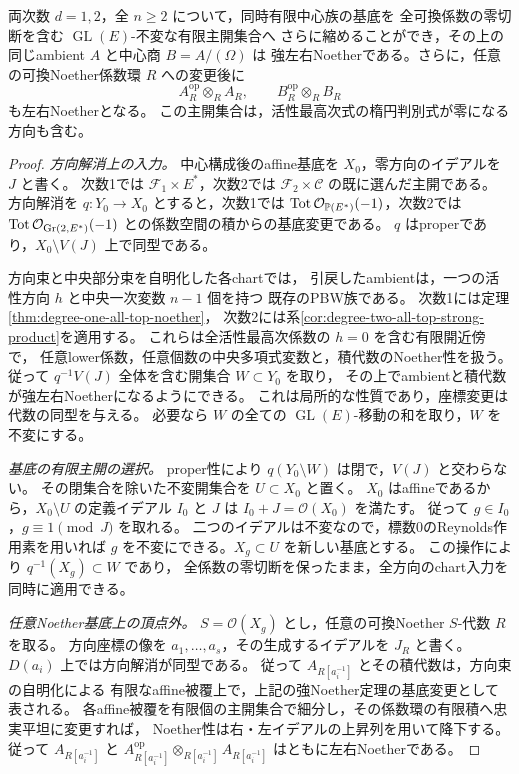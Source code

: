 \begin{theorem}\label{thm:simultaneous-strong-product-noether}
両次数 $d=1,2$，全 $n\ge2$ について，同時有限中心族の基底を
全可換係数の零切断を含む $\operatorname{GL}(E)$-不変な有限主開集合へ
さらに縮めることができ，その上の同じambient $A$ と中心商 $B=A/(\Omega)$ は
強左右Noetherである。さらに，任意の可換Noether係数環 $R$ への変更後に
\[
 A_R^{\mathrm{op}}\otimes_R A_R,\qquad
 B_R^{\mathrm{op}}\otimes_R B_R
\]
も左右Noetherとなる。
この主開集合は，活性最高次式の楕円判別式が零になる方向も含む。
\end{theorem}
\begin{proof}
\emph{方向解消上の入力。}
中心構成後のaffine基底を $X_0$，零方向のイデアルを $J$ と書く。
次数1では $\mathcal F_1\times E^*$，次数2では
$\mathcal F_2\times\mathcal C$ の既に選んだ主開である。
方向解消を $q:Y_0\to X_0$ とすると，次数1では
$\operatorname{Tot}\mathcal O_{\mathbb P(E^*)}(-1)$，次数2では
$\operatorname{Tot}\mathcal O_{\operatorname{Gr}(2,E^*)}(-1)$ との係数空間の積からの基底変更である。
$q$ はproperであり，$X_0\setminus V(J)$ 上で同型である。

方向束と中央部分束を自明化した各chartでは，
引戻したambientは，一つの活性方向 $h$ と中央一次変数 $n-1$ 個を持つ
既存のPBW族である。
次数1には定理\ref{thm:degree-one-all-top-noether}，
次数2には系\ref{cor:degree-two-all-top-strong-product}を適用する。
これらは全活性最高次係数の $h=0$ を含む有限開近傍で，
任意lower係数，任意個数の中央多項式変数と，積代数のNoether性を扱う。
従って $q^{-1}V(J)$ 全体を含む開集合 $W\subset Y_0$ を取り，
その上でambientと積代数が強左右Noetherになるようにできる。
これは局所的な性質であり，座標変更は代数の同型を与える。
必要なら $W$ の全ての $\operatorname{GL}(E)$-移動の和を取り，$W$ を不変にする。

\emph{基底の有限主開の選択。}
proper性により $q(Y_0\setminus W)$ は閉で，$V(J)$ と交わらない。
その閉集合を除いた不変開集合を $U\subset X_0$ と置く。
$X_0$ はaffineであるから，$X_0\setminus U$ の定義イデアル $I_0$ と
$J$ は $I_0+J=\mathcal O(X_0)$ を満たす。
従って $g\in I_0$，$g\equiv1\pmod J$ を取れる。
二つのイデアルは不変なので，標数0のReynolds作用素を用いれば
$g$ を不変にできる。$X_g\subset U$ を新しい基底とする。
この操作により $q^{-1}(X_g)\subset W$ であり，
全係数の零切断を保ったまま，全方向のchart入力を同時に適用できる。

\emph{任意Noether基底上の頂点外。}
$S=\mathcal O(X_g)$ とし，任意の可換Noether $S$-代数 $R$ を取る。
方向座標の像を $a_1,\ldots,a_s$，その生成するイデアルを $J_R$ と書く。
$D(a_i)$ 上では方向解消が同型である。
従って $A_{R[a_i^{-1}]}$ とその積代数は，方向束の自明化による
有限なaffine被覆上で，上記の強Noether定理の基底変更として表される。
各affine被覆を有限個の主開集合で細分し，その係数環の有限積へ忠実平坦に変更すれば，
Noether性は右・左イデアルの上昇列を用いて降下する。
従って $A_{R[a_i^{-1}]}$ と
$A_{R[a_i^{-1}]}^{\mathrm{op}}\otimes_{R[a_i^{-1}]}A_{R[a_i^{-1}]}$
はともに左右Noetherである。


\end{proof}
